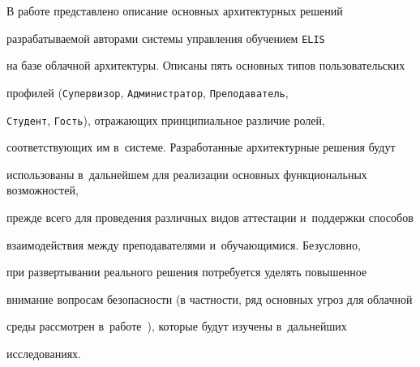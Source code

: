 \vspace*{-3pt}





В работе представлено описание основных архитектурных решений 


разрабатываемой авторами системы управления обучением \verb"ELIS" 


на базе облачной архитектуры. Описаны пять основных типов пользовательских 


профилей (\verb"Супервизор", \verb"Администратор", \verb"Преподаватель", 


\verb"Студент", \verb"Гость"), отражающих принципиальное различие ролей, 


соответствующих им  в~системе. Разработанные архитектурные решения будут 


использованы в~дальнейшем для реализации основных функциональных возможностей, 


прежде всего для проведения различных видов аттестации и~поддержки способов 


взаимодействия между преподавателями и~обучающимися. Безусловно, 


при развертывании реального решения потребуется уделять повышенное 


внимание вопросам безопасности (в частности, ряд основных угроз для облачной 


среды рассмотрен в~работе~\cite{Subashini2011}), которые будут изучены в~дальнейших 


исследованиях.





\vspace*{-3pt}





